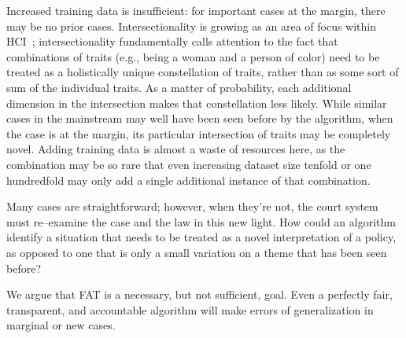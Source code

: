 \documentclass[main]{subfiles}
\begin{document}
Increased training data is insufficient: for important cases at the margin,
there may be no prior cases.
Intersectionality is growing as an area of focus within HCI~\cite{schlesinger2017intersectional};
intersectionality fundamentally calls attention to the fact that combinations of traits
(e.g., being a woman and a person of color)
need to be treated as a holistically unique constellation of traits, rather than
as some sort of sum of the individual traits.
As a matter of probability,
each additional dimension in the intersection makes that constellation less likely.
While similar cases in the mainstream may well have been seen before by the algorithm,
when the case is at the margin,
its particular intersection of traits may be completely novel.
Adding training data is almost a waste of resources here, as
the combination may be so rare that even
increasing dataset size tenfold or one hundredfold
may only add a single additional instance of that combination.

Many cases are straightforward; however, when they're not,
the court system must re--examine the case and the law in this new light.
How could an algorithm identify a situation that needs to be treated as
a novel interpretation of a policy, as opposed to
one that is only a small variation on a theme that has been seen before?

We argue that FAT is a necessary, but not sufficient, goal.
Even a perfectly fair, transparent, and accountable algorithm
will make errors of generalization in marginal or new cases.

\onlyinsubfile{
  
  
}
\end{document}
